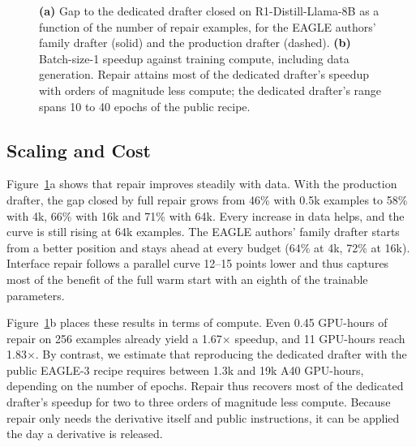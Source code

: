 \documentclass[11pt]{article}
\newcommand{\Ours}{Interface repair}
\begin{document}
\begin{figure}[t]
  \centering
  
  \caption{\textbf{(a)} Gap to the dedicated drafter closed on R1-Distill-Llama-8B as a function of the number of repair examples, for the EAGLE authors' family drafter (solid) and the production drafter (dashed). \textbf{(b)} Batch-size-1 speedup against training compute, including data generation. Repair attains most of the dedicated drafter's speedup with orders of magnitude less compute; the dedicated drafter's range spans 10 to 40 epochs of the public recipe.}
  \label{fig:scaling}
\end{figure}

\subsection{Scaling and Cost}

Figure~\ref{fig:scaling}a shows that repair improves steadily with data.
With the production drafter, the gap closed by full repair grows from 46\% with 0.5k examples to 58\% with 4k, 66\% with 16k and 71\% with 64k.
Every increase in data helps, and the curve is still rising at 64k examples.
The EAGLE authors' family drafter starts from a better position and stays ahead at every budget (64\% at 4k, 72\% at 16k).
\Ours{} follows a parallel curve 12--15 points lower and thus captures most of the benefit of the full warm start with an eighth of the trainable parameters.

Figure~\ref{fig:scaling}b places these results in terms of compute.
Even 0.45 GPU-hours of repair on 256 examples already yield a 1.67$\times$ speedup, and 11 GPU-hours reach 1.83$\times$.
By contrast, we estimate that reproducing the dedicated drafter with the public EAGLE-3 recipe requires between 1.3k and 19k A40 GPU-hours, depending on the number of epochs.
Repair thus recovers most of the dedicated drafter's speedup for two to three orders of magnitude less compute.
Because repair only needs the derivative itself and public instructions, it can be applied the day a derivative is released.
\end{document}
